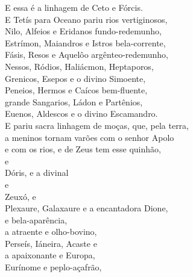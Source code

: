\begin{pages}
\begin{Rightside}
\Para
E essa é a linhagem de Ceto e Fórcis.\\
E Tetís para Oceano pariu rios vertiginosos,\\
Nilo, Alfeios e Eridanos fundo-redemunho,\\
Estrímon, Maiandros e Istros bela-corrente,\\
Fásis, Resos e Aquelôo argênteo-redemunho, \\
Nessos, Ródios, Haliácmon, Heptaporos,\\
Grenicos, Esepos e o divino Simoente,\\
Peneios, Hermos e Caícos bem-fluente,\\
grande Sangarios, Ládon e Partênios,\\
Euenos, Aldescos e o divino Escamandro. \\
E pariu sacra linhagem de moças, que, pela terra,\\
a meninos tornam varões com o senhor Apolo\\
e com os rios, e de Zeus tem esse quinhão,\\
   e \\
Dóris,  e a divinal  \\
   e \\
Zeuxó,   e \\
Plexaure, Galaxaure e a encantadora Dione,\\
  e  bela-aparência,\\
a atraente  e  olho-bovino,\\ 
Perseís, Iáneira, Acaste e \\
a apaixonante   e Europa,\\
 Eurínome e  peplo-açafrão,\\

\end{Rightside}
\end{pages}
